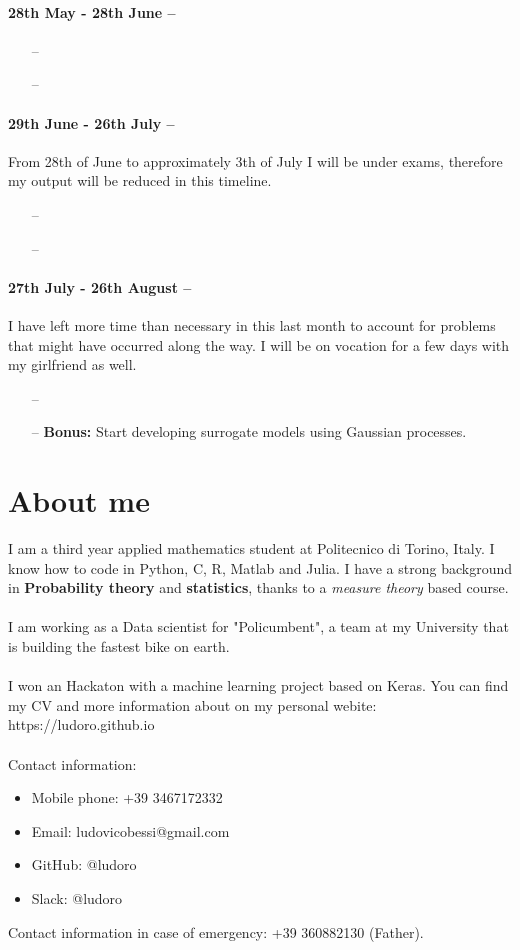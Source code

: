 \documentclass[11pt,a4paper,oneside,titlepage,openright]{book}
\begin{document}
\subsubsection*{28th May - 28th June -- }

\begin{itemize}
\item[--] 
\item[--] 
\end{itemize}

\subsubsection*{29th June - 26th July -- }

From 28th of June to approximately 3th of July I will be under exams, therefore my output will be reduced in this timeline. \\
\begin{itemize}
\item[--]
\item[--] 
\end{itemize}

\subsubsection*{27th July - 26th August -- }
I have left more time than necessary in this last month to account for problems that might have occurred along the way. I will be on vocation for a few days with my girlfriend as well. \\
\begin{itemize}
\item[--]
\item[--] \textbf{Bonus:} Start developing surrogate models using Gaussian processes.
\end{itemize}



\chapter*{About me}

I am a third year applied mathematics student at Politecnico di Torino, Italy. I know how to code in Python, C, R, Matlab and Julia. I have a strong background in \textbf{Probability theory} and \textbf{statistics}, thanks to a \textit{measure theory} based course.\\\\ 
I am working as a Data scientist for "Policumbent", a team at my University that is building the fastest bike on earth.\\\\
I won an Hackaton with a machine learning project based on Keras. You can find my CV and more information about on my personal webite:  https://ludoro.github.io  
\\\\
Contact information: 

\begin{itemize}
\item Mobile phone: +39 3467172332
\item Email: ludovicobessi@gmail.com
\item GitHub: @ludoro 
\item Slack: @ludoro

\end{itemize}
 
 Contact information in case of emergency: +39 360882130 (Father).
\end{document}
